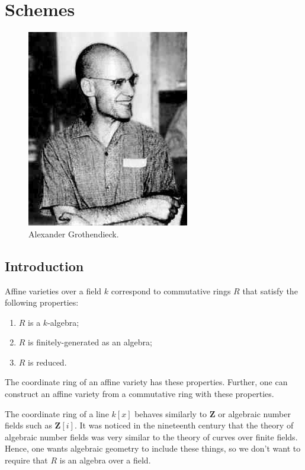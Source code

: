 \documentclass [11 pt, oneside, margin = 1 in] {article}
\begin{document}
\section{Schemes}

\begin{figure}
\begin{center}
\includegraphics[scale=0.8]{images/groth}
\caption{Alexander Grothendieck.}
\end{center}
\end{figure}

\subsection{Introduction}
Affine varieties over a field $k$ correspond to commutative rings $R$ that satisfy the following properties:
\begin{enumerate}
	\item $R$ is a $k$-algebra;
	\item $R$ is finitely-generated as an algebra;
	\item $R$ is reduced.
\end{enumerate}
The coordinate ring of an affine variety has these properties. Further, one can construct an affine variety from a commutative ring with these properties.

The coordinate ring of a line $k[x]$ behaves similarly to $\mathbf{Z}$ or algebraic number fields such as $\mathbf{Z}[i]$. It was noticed in the nineteenth century that the theory of algebraic number fields was very similar to the theory of curves over finite fields. Hence, one wants algebraic geometry to include these things, so we don't want to require that $R$ is an algebra over a field. 
\end{document}
